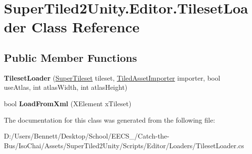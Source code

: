 \hypertarget{class_super_tiled2_unity_1_1_editor_1_1_tileset_loader}{}\section{Super\+Tiled2\+Unity.\+Editor.\+Tileset\+Loader Class Reference}
\label{class_super_tiled2_unity_1_1_editor_1_1_tileset_loader}
\subsection*{Public Member Functions}
\begin{DoxyCompactItemize}
\item 
\mbox{\label{class_super_tiled2_unity_1_1_editor_1_1_tileset_loader_a39e624b6578673cc693bfa2a387506a4}} 
{\bfseries Tileset\+Loader} (\mbox{\hyperlink{class_super_tiled2_unity_1_1_editor_1_1_super_tileset}{Super\+Tileset}} tileset, \mbox{\hyperlink{class_super_tiled2_unity_1_1_editor_1_1_tiled_asset_importer}{Tiled\+Asset\+Importer}} importer, bool use\+Atlas, int atlas\+Width, int atlas\+Height)
\item 
\mbox{\label{class_super_tiled2_unity_1_1_editor_1_1_tileset_loader_a6c9cc3cd8093ca4aad1e29e09fb72f54}} 
bool {\bfseries Load\+From\+Xml} (X\+Element x\+Tileset)
\end{DoxyCompactItemize}


The documentation for this class was generated from the following file\+:\begin{DoxyCompactItemize}
\item 
D\+:/\+Users/\+Bennett/\+Desktop/\+School/\+E\+E\+C\+S\+\_/\+Catch-\/the-\/\+Bus/\+Iso\+Chai/\+Assets/\+Super\+Tiled2\+Unity/\+Scripts/\+Editor/\+Loaders/Tileset\+Loader.\+cs\end{DoxyCompactItemize}
